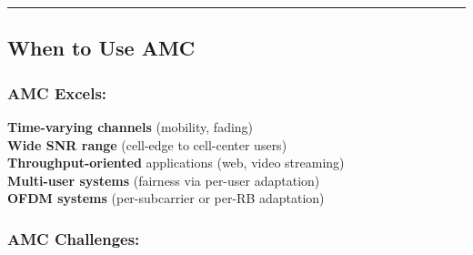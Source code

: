 \begin{Shaded}
\begin{Highlighting}[]
\NormalTok{(}\SpecialCharTok{\{}\SpecialCharTok{\}}\NormalTok{)}
\NormalTok{(}\SpecialCharTok{\{}\NormalTok{)}
\NormalTok{(}\SpecialCharTok{\{}\NormalTok{)}
\NormalTok{(}\SpecialCharTok{\{}\OperatorTok{/}\NormalTok{)}
\NormalTok{(}\SpecialCharTok{\{}\NormalTok{)}
\end{Highlighting}
\end{Shaded}

\begin{center}\rule{0.5\linewidth}{0.5pt}\end{center}

\subsection{\texorpdfstring{ When to Use
AMC}{ When to Use AMC}}\label{when-to-use-amc}

\subsubsection{AMC Excels:}\label{amc-excels}

\textbf{Time-varying channels} (mobility, fading)\\
\textbf{Wide SNR range} (cell-edge to cell-center users)\\
\textbf{Throughput-oriented} applications (web, video streaming)\\
\textbf{Multi-user systems} (fairness via per-user adaptation)\\
\textbf{OFDM systems} (per-subcarrier or per-RB adaptation)

\subsubsection{AMC Challenges:}\label{amc-challenges}


